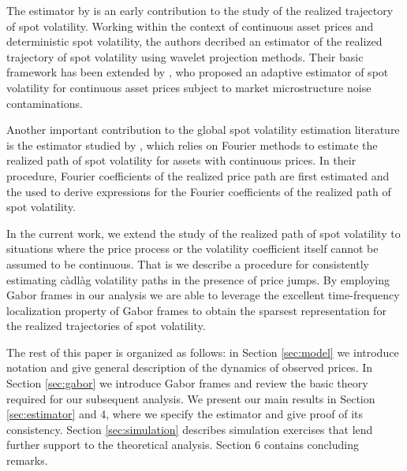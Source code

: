 \documentclass[a4paper, 12pt,preprint]{article}
\newcommand{\cadlag}{c\`adl\`ag\xspace}
\begin{document}
The estimator by \cite{GenonCatalot1992} is an early contribution to the study of the realized trajectory of spot volatility. Working within the context of continuous asset prices and deterministic spot volatility, the authors  decribed an estimator of the realized trajectory of spot volatility using wavelet projection methods.  Their basic framework  has   been extended by  \cite{Hoffmann2012}, who proposed   an adaptive estimator of  spot volatility  for continuous asset  prices subject to market microstructure noise contaminations.

Another  important contribution to the global spot volatility estimation literature  is the estimator  studied by \cite{Malliavin2002}, which relies on Fourier methods to  estimate the realized path of spot volatility for assets with continuous prices. In their procedure,  Fourier coefficients of the realized price path are first estimated and the used to derive expressions for  the Fourier coefficients of the realized path of spot volatility.     

In the current work, we extend the study of the realized path of spot volatility to situations where the price process  or  the volatility coefficient   itself cannot be assumed to be continuous.  That is we describe a procedure for consistently estimating \cadlag volatility paths in the presence of price jumps. By employing Gabor frames in our analysis we are able to leverage the excellent time-frequency localization property of Gabor frames to obtain the sparsest  representation for the realized trajectories of spot volatility. 

The rest of this paper is organized as follows: in Section \ref{sec:model} we introduce notation and give general description of  the dynamics  of  observed prices. In  Section \ref{sec:gabor} we introduce   Gabor frames and review the basic theory required for our subsequent analysis. We present our main results in  Section \ref{sec:estimator} and 4, where we specify the estimator and give proof of its consistency. Section \ref{sec:simulation} describes simulation exercises that lend further support to the theoretical analysis.  Section 6 contains concluding remarks. 

\end{document}
